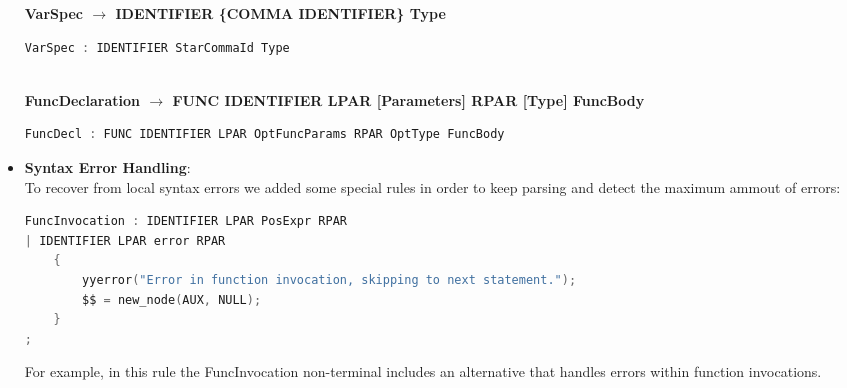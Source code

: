 \documentclass[12pt]{article}
\begin{document}
\begin{itemize}
\begin{center}
\begin{lstlisting}[language=C, basicstyle=\small\ttfamily]
            \end{lstlisting}
                \end{center}
            \begin{center}
                \small\textbf{VarSpec $\rightarrow$ IDENTIFIER \{COMMA IDENTIFIER\} Type}
            \end{center}
            \begin{center}
                \begin{lstlisting}[language=C, basicstyle=\small\ttfamily]
VarSpec : IDENTIFIER StarCommaId Type
 
            \end{lstlisting}
        \end{center}
        \begin{center}
        \small\textbf{FuncDeclaration $\rightarrow$ FUNC IDENTIFIER LPAR [Parameters] RPAR [Type] FuncBody}
        \end{center}
        \begin{center}
        \begin{lstlisting}[language=C, basicstyle=\small\ttfamily]
FuncDecl : FUNC IDENTIFIER LPAR OptFuncParams RPAR OptType FuncBody

    \end{lstlisting}
    \end{center}

    \item \textbf{Syntax Error Handling}:\\
    To recover from local syntax errors we added some special rules in order to keep parsing and detect the maximum ammout of errors:
    \begin{center}
        \begin{lstlisting}[language=C, basicstyle=\small\ttfamily]
FuncInvocation : IDENTIFIER LPAR PosExpr RPAR
| IDENTIFIER LPAR error RPAR
    {
        yyerror("Error in function invocation, skipping to next statement.");
        $$ = new_node(AUX, NULL);
    }
;
    \end{lstlisting}
\end{center}
For example, in this rule the FuncInvocation non-terminal includes an alternative that handles errors within function invocations.
    \end{itemize}
\end{document}
